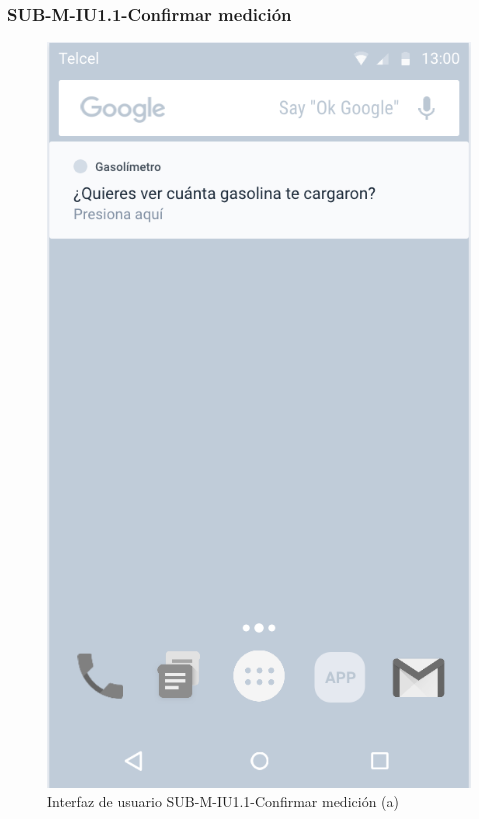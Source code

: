 \subsubsection{SUB-M-IU1.1-Confirmar medición}\label{SUB-M-IU1.1}
\begin{figure}[H]
	\centering
	\includegraphics[scale=1]{Capitulo4/software/submodulos/mediciones/images/sub-m-iu1_1_a}
	\caption{Interfaz de usuario SUB-M-IU1.1-Confirmar medición (a)}
	\label{fig:sub-m-iu1.1.a}
\end{figure}

